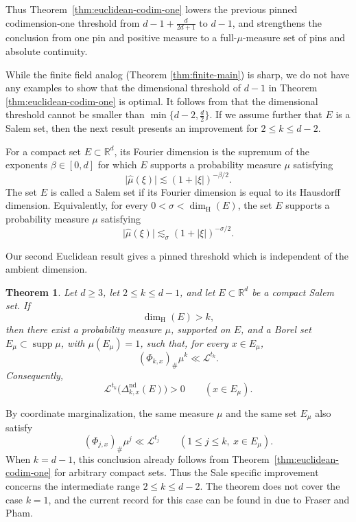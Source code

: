 \documentclass[11pt]{article}
\newtheorem{theorem}{Theorem}[section]
\theoremstyle{remark}
\newcommand{\R}{\mathbb R}
\newcommand{\cL}{\mathcal L}
\newcommand{\supp}{\operatorname{supp}}
\newcommand{\wh}{\widehat}
\numberwithin{equation}{section}
\newcommand{\1}{\mathbf 1}
\begin{document}
Thus Theorem~\ref{thm:euclidean-codim-one} lowers the previous pinned
codimension-one threshold from
\(d-1+\frac{d}{2d+1}\) to \(d-1\), and strengthens the conclusion from
one pin and positive measure to a full-\(\mu\)-measure set of pins and
absolute continuity. 

While the finite field analog (Theorem \ref{thm:finite-main}) is sharp, we do not have any examples to show that the dimensional threshold of $d-1$ in Theorem \ref{thm:euclidean-codim-one} is optimal. It follows from \cite[Theorem 1.8]{GILP} that the dimensional threshold cannot be smaller than $\min\{d-2, \frac{d}{2}\}$. If we assume further that $E$ is a Salem set, then the next result presents an improvement for $2\le k\le d-2$.

For a compact set \(E\subset\R^d\), its Fourier dimension is the
supremum of the exponents \(\beta\in[0,d]\) for which \(E\) supports a
probability measure \(\mu\) satisfying
\[
        \lvert\wh\mu(\xi)\rvert
        \lesssim
        (1+\lvert\xi\rvert)^{-\beta/2}.
\]
The set \(E\) is called a Salem set if its Fourier dimension is equal
to its Hausdorff dimension.  Equivalently, for every
\(0<\sigma<\dim_{\mathrm H}(E)\), the set \(E\) supports a probability
measure \(\mu\) satisfying
\[
        \lvert\wh\mu(\xi)\rvert
        \lesssim_\sigma
        (1+\lvert\xi\rvert)^{-\sigma/2}.
\]


Our second Euclidean result gives a pinned threshold which is
independent of the ambient dimension.

\begin{theorem}\label{thm:pinned-salem}
Let \(d\geq3\), let \(2\leq k\leq d-1\), and let
\(E\subset\R^d\) be a compact Salem set.  If
\[
        \dim_{\mathrm H}(E)>k,
\]
then there exist a probability measure \(\mu\), supported on \(E\),
and a Borel set \(E_\mu\subset\supp\mu\), with \(\mu(E_\mu)=1\), such
that, for every \(x\in E_\mu\),
\[
        (\Phi_{k,x})_\#\mu^k\ll\cL^{t_k}.
\]
Consequently,
\[
\cL^{t_k}\bigl(\Delta_{k,x}^{\mathrm{nd}}(E)\bigr)>0
\qquad (x\in E_\mu).
\]
\end{theorem}


By coordinate marginalization, the same measure $\mu$ and the same set
$E_\mu$ also satisfy
\[
(\Phi_{j,x})_\#\mu^j\ll\cL^{t_j}
\qquad
(1\le j\le k,\ x\in E_\mu).
\]
When \(k=d-1\), this conclusion already follows from
Theorem~\ref{thm:euclidean-codim-one} for arbitrary compact sets.
Thus the Sale specific improvement concerns the intermediate range
\(2\leq k\leq d-2\). The theorem does not cover the case $k=1$, and the current record for this case can be found in\cite[Theorem~2.4(1)]{FraserPham} due to Fraser and
Pham.
\end{document}

